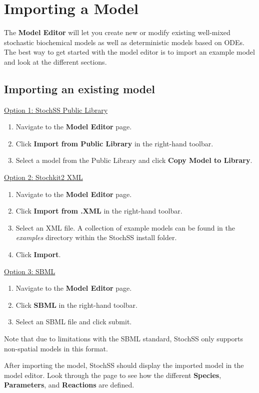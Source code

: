 \section{Importing a Model}
The \textbf{Model Editor} will let you create new or modify existing well-mixed stochastic biochemical models as well as deterministic models based on ODEs.
The best way to get started with the model editor is to import an example model and look at the different sections.

\subsection{Importing an existing model}

\underline{Option 1: StochSS Public Library}
\begin{enumerate}
  \item Navigate to the \textbf{Model Editor} page.
  \item Click \textbf{Import from Public Library} in the right-hand toolbar.
  \item Select a model from the Public Library and click \textbf{Copy Model to Library}.
\end{enumerate}

\noindent\underline{Option 2: Stochkit2 XML}
\begin{enumerate}
  \item Navigate to the \textbf{Model Editor} page.
  \item Click \textbf{Import from .XML} in the right-hand toolbar.
  \item Select an XML file. A collection of example models can be found in the \textit{examples} directory within the StochSS install folder.
  \item Click \textbf{Import}.
\end{enumerate}

\noindent\underline{Option 3: SBML}
\begin{enumerate}
  \item Navigate to the \textbf{Model Editor} page.
  \item Click \textbf{SBML} in the right-hand toolbar.
  \item Select an SBML file and click submit.
\end{enumerate}

Note that due to limitations with the SBML standard, StochSS only supports non-spatial models in this format.

After importing the model, StochSS should display the imported model in the model editor.
Look through the page to see how the different \textbf{Species}, \textbf{Parameters}, and \textbf{Reactions} are defined.

